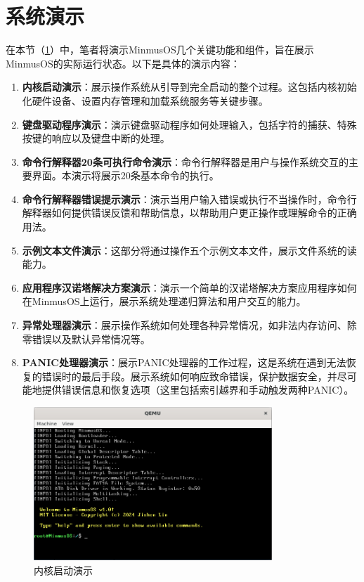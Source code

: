\section{系统演示}\label{sec:SystemPresentation}

在本节（\cref{sec:SystemPresentation}）中，笔者将演示MinmusOS几个关键功能和组件，旨在展示MinmusOS的实际运行状态。以下是具体的演示内容：

\begin{enumerate}
    \item \textbf{内核启动演示}：展示操作系统从引导到完全启动的整个过程。这包括内核初始化硬件设备、设置内存管理和加载系统服务等关键步骤。
    \item \textbf{键盘驱动程序演示}：演示键盘驱动程序如何处理输入，包括字符的捕获、特殊按键的响应以及键盘中断的处理。
    \item \textbf{命令行解释器20条可执行命令演示}：命令行解释器是用户与操作系统交互的主要界面。本演示将展示20条基本命令的执行。
    \item \textbf{命令行解释器错误提示演示}：演示当用户输入错误或执行不当操作时，命令行解释器如何提供错误反馈和帮助信息，以帮助用户更正操作或理解命令的正确用法。
    \item \textbf{示例文本文件演示}：这部分将通过操作五个示例文本文件，展示文件系统的读能力。
    \item \textbf{应用程序汉诺塔解决方案演示}：演示一个简单的汉诺塔解决方案应用程序如何在MinmusOS上运行，展示系统处理递归算法和用户交互的能力。
    \item \textbf{异常处理器演示}：展示操作系统如何处理各种异常情况，如非法内存访问、除零错误以及默认异常情况等。
    \item \textbf{PANIC处理器演示}：展示PANIC处理器的工作过程，这是系统在遇到无法恢复的错误时的最后手段。展示系统如何响应致命错误，保护数据安全，并尽可能地提供错误信息和恢复选项（这里包括索引越界和手动触发两种PANIC）。
\end{enumerate}

\begin{figure}[htbp]
    \centering
    \includegraphics[width=0.8\textwidth]{figures/KernelBootPresentation.png}
    \caption{内核启动演示}
\end{figure}

